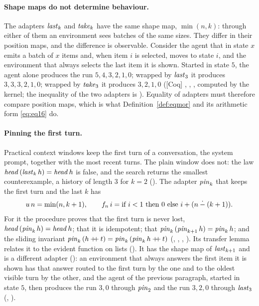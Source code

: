 \documentclass{fundam}
\begin{document}
\paragraph{Shape maps do not determine behaviour.}  The adapters $\mathit{last}_k$ and
$\mathit{take}_k$ have the same shape map, $\min(n,k)$: through either of them an
environment sees batches of the same sizes.  They differ in their position maps, and
the difference is observable.  Consider the agent that in state $x$ emits a batch of
$x$ items and, when item $i$ is selected, moves to state $i$, and the environment that
always selects the last item it is shown.  Started in state $5$, the agent alone
produces the run $5, 4, 3, 2, 1, 0$; wrapped by $\mathit{last}_3$ it produces
$3, 3, 3, 2, 1, 0$; wrapped by $\mathit{take}_3$ it produces $3, 2, 1, 0$ (\textsf{[Coq]}
, , , computed by the kernel; the
inequality of the two adapters is ).  Equality of adapters must
therefore compare position maps, which is what Definition~\ref{def:eqmor} and its
arithmetic form \eqref{eq:eq16} do.

\paragraph{Pinning the first turn.}  Practical context windows keep the first turn of a
conversation, the system prompt, together with the most recent turns.  The plain window
does not: the law $\mathit{head}\,(\mathit{last}_k\,h) = \mathit{head}\,h$ is false, and the search returns
the smallest counterexample, a history of length $3$ for $k = 2$
().  The adapter $\mathit{pin}_k$ that keeps the first turn and the last $k$
has
\[
  u\,n = \min(n, k+1), \qquad
  f_n\,i = \text{if } i < 1 \text{ then } 0 \text{ else } i + (n \mathbin{\dot{-}} (k+1)) .
\]
For it the procedure proves that the first turn is never lost,
$\mathit{head}\,(\mathit{pin}_k\,h) = \mathit{head}\,h$; that it is idempotent; that
$\mathit{pin}_k\,(\mathit{pin}_{k+1}\,h) = \mathit{pin}_k\,h$; and the sliding invariant
$\mathit{pin}_k\,(h \mathbin{+\!\!+} t) = \mathit{pin}_k\,(\mathit{pin}_k\,h \mathbin{+\!\!+} t)$ (, ,
, ).  Its transfer lemma relates it to the evident function
on lists ().  It has the shape map of $\mathit{last}_{k+1}$ and is a different
adapter (): an environment that always answers the first item it
is shown has that answer routed to the first turn by the one and to the oldest visible
turn by the other, and the agent of the previous paragraph, started in state $5$, then
produces the run $3, 0$ through $\mathit{pin}_2$ and the run $3, 2, 0$ through
$\mathit{last}_3$ (, ).
\end{document}
